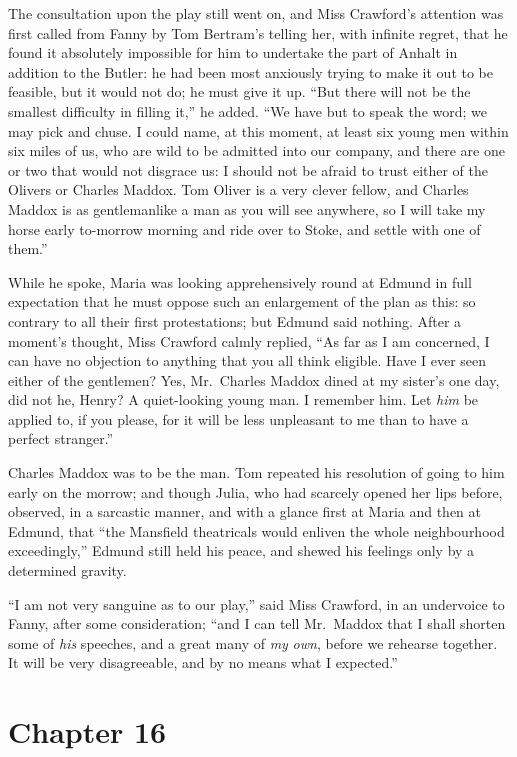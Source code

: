 The consultation upon the play still went on, and Miss
Crawford's attention was first called from Fanny by Tom
Bertram's telling her, with infinite regret, that he
found it absolutely impossible for him to undertake the
part of Anhalt in addition to the Butler:  he had been
most anxiously trying to make it out to be feasible,
but it would not do; he must give it up.  ``But there will
not be the smallest difficulty in filling it,'' he added.
``We have but to speak the word; we may pick and chuse.
I could name, at this moment, at least six young men within
six miles of us, who are wild to be admitted into our company,
and there are one or two that would not disgrace us:
I should not be afraid to trust either of the Olivers
or Charles Maddox.  Tom Oliver is a very clever fellow,
and Charles Maddox is as gentlemanlike a man as you will
see anywhere, so I will take my horse early to-morrow
morning and ride over to Stoke, and settle with one
of them.''

While he spoke, Maria was looking apprehensively round
at Edmund in full expectation that he must oppose such
an enlargement of the plan as this:  so contrary to all
their first protestations; but Edmund said nothing.
After a moment's thought, Miss Crawford calmly replied,
``As far as I am concerned, I can have no objection to
anything that you all think eligible.  Have I ever seen
either of the gentlemen?  Yes, Mr.\ Charles Maddox dined
at my sister's one day, did not he, Henry?  A quiet-looking
young man.  I remember him.  Let \emph{him} be applied to,
if you please, for it will be less unpleasant to me than
to have a perfect stranger.''

Charles Maddox was to be the man.  Tom repeated his resolution
of going to him early on the morrow; and though Julia,
who had scarcely opened her lips before, observed, in a
sarcastic manner, and with a glance first at Maria and then
at Edmund, that ``the Mansfield theatricals would enliven
the whole neighbourhood exceedingly,'' Edmund still held
his peace, and shewed his feelings only by a determined gravity.

``I am not very sanguine as to our play,'' said Miss Crawford,
in an undervoice to Fanny, after some consideration;
``and I can tell Mr.\ Maddox that I shall shorten some
of \emph{his} speeches, and a great many of \emph{my} \emph{own},
before we rehearse together.  It will be very disagreeable,
and by no means what I expected.''



\chapter{Chapter 16}

